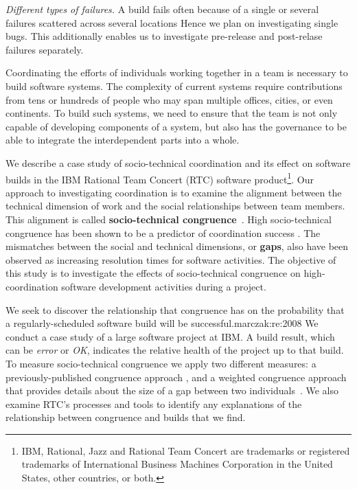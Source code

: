 \documentclass[12pt,oneside]{book}
\begin{document}
\emph{Different types of failures.}
A build fails often because of a single or several failures scattered across several locations
Hence we plan on
investigating single bugs. This additionally enables us to investigate pre-release and post-relase failures separately.



Coordinating the efforts of individuals working together in a team is
necessary to build software systems. The complexity of current systems require contributions
from tens or hundreds of people who may span multiple offices, cities, or even continents.
To build such systems, we need to ensure that the team is not only capable of
developing components of a system, but also has the governance to be able to integrate the
interdependent parts into a whole.

We describe a case study of socio-technical coordination and its effect on software builds in the IBM\textsuperscript{\textregistered}
Rational Team Concert\textsuperscript{\textregistered} (RTC) software product\footnote{IBM, Rational, Jazz and Rational Team Concert are trademarks or registered trademarks of International Business Machines Corporation in the United States, other countries, or both.}.
Our approach to investigating coordination is to examine the
alignment between the technical dimension of work and the social relationships
between team members. This alignment is called \textbf{socio-technical
congruence}~\cite{cataldo:cscw:2006}. High socio-technical congruence
has been shown to be a predictor of coordination success
\cite{cataldo:cscw:2006,ehrlich2008:gaps}.
The mismatches between the social and technical dimensions, or \textbf{gaps},
also have been observed as increasing resolution times for software activities.
The objective of this study is to investigate the effects of socio-technical congruence on high-coordination software development activities during a project.

We seek to discover the relationship that congruence has on the probability that a regularly-scheduled software build will be successful.marczak:re:2008
We conduct a case study of a large software project at IBM.  A build result, which can be \emph{error} or \emph{OK}, indicates the relative health of the project up to that build. To
measure socio-technical congruence we apply two different measures: a
previously-published congruence approach \cite{cataldo:cscw:2006},
and a weighted congruence approach that provides details about the size of a
gap between two individuals~\cite{kwan2009:weighted}. We
also examine RTC's processes and tools to identify any
explanations of the relationship between congruence and builds that
we find.
\end{document}
